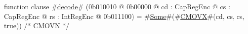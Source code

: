 function clause #\hyperref[sailMIPSzdecode]{decode}# (0b010010 @ 0b00000 @ cd : CapRegEnc @ cs : CapRegEnc @ rs : IntRegEnc @ 0b011100) = #\hyperref[sailMIPSzSome]{Some}#(#\hyperref[sailMIPSzCMOVX]{CMOVX}#(cd, cs, rs, true))  /* CMOVN */

